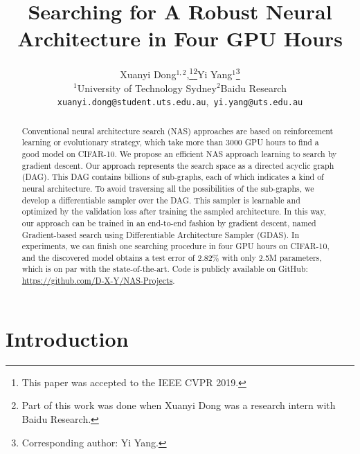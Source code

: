 \documentclass[10pt,twocolumn,letterpaper]{article}
\begin{document}
\title{Searching for A Robust Neural Architecture in Four GPU Hours}

\author{Xuanyi Dong$^{1,2}$,\thanks{This paper was accepted to the IEEE CVPR 2019.}\thanks{Part of this work was done when Xuanyi Dong was a research intern with Baidu Research.}Yi Yang$^{1}$\thanks{Corresponding author: Yi Yang.}\\
$^{1}$University of Technology Sydney\hspace{4mm}$^{2}$Baidu Research \\
{\tt\small xuanyi.dong@student.uts.edu.au},~{\tt\small yi.yang@uts.edu.au}
}


\maketitle
\thispagestyle{empty}

\begin{abstract}

Conventional neural architecture search (NAS) approaches are based on reinforcement learning or evolutionary strategy, which take more than 3000 GPU hours to find a good model on CIFAR-10.
We propose an efficient NAS approach learning to search by gradient descent.
Our approach represents the search space as a directed acyclic graph (DAG). This DAG contains billions of sub-graphs, each of which indicates a kind of neural architecture.
To avoid traversing all the possibilities of the sub-graphs, we develop a differentiable sampler over the DAG.
This sampler is learnable and optimized by the validation loss after training the sampled architecture.
In this way, our approach can be trained in an end-to-end fashion by gradient descent, named Gradient-based search using Differentiable Architecture Sampler (GDAS).
In experiments, we can finish one searching procedure in four GPU hours on CIFAR-10, and the discovered model obtains a test error of 2.82\% with only 2.5M parameters, which is on par with the state-of-the-art.
Code is publicly available on GitHub: \url{https://github.com/D-X-Y/NAS-Projects}.
\end{abstract}



\section{Introduction}
\end{document}
